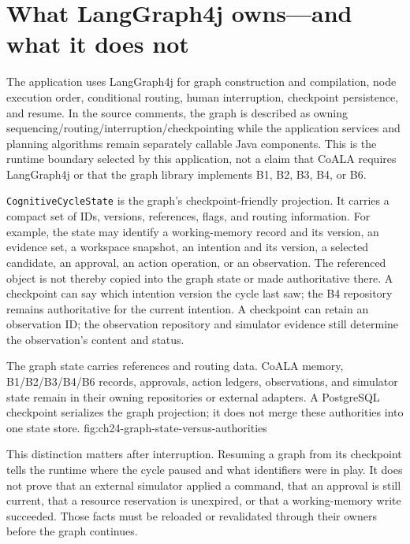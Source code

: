 \section{What LangGraph4j owns---and what it does not}
\label{sec:ch24-langgraph-boundary}

The application uses LangGraph4j for graph construction and compilation, node execution order, conditional routing, human interruption, checkpoint persistence, and resume. In the source comments, the graph is described as owning sequencing/routing/interruption/checkpointing while the application services and planning algorithms remain separately callable Java components. This is the runtime boundary selected by this application, not a claim that CoALA requires LangGraph4j or that the graph library implements B1, B2, B3, B4, or B6.

\texttt{CognitiveCycleState} is the graph's checkpoint-friendly projection. It carries a compact set of IDs, versions, references, flags, and routing information. For example, the state may identify a working-memory record and its version, an evidence set, a workspace snapshot, an intention and its version, a selected candidate, an approval, an action operation, or an observation. The referenced object is not thereby copied into the graph state or made authoritative there. A checkpoint can say which intention version the cycle last saw; the B4 repository remains authoritative for the current intention. A checkpoint can retain an observation ID; the observation repository and simulator evidence still determine the observation's content and status.

  {The graph state carries references and routing data. CoALA memory, B1/B2/B3/B4/B6 records, approvals, action ledgers, observations, and simulator state remain in their owning repositories or external adapters. A PostgreSQL checkpoint serializes the graph projection; it does not merge these authorities into one state store.}
  {fig:ch24-graph-state-versus-authorities}

This distinction matters after interruption. Resuming a graph from its checkpoint tells the runtime where the cycle paused and what identifiers were in play. It does not prove that an external simulator applied a command, that an approval is still current, that a resource reservation is unexpired, or that a working-memory write succeeded. Those facts must be reloaded or revalidated through their owners before the graph continues.

